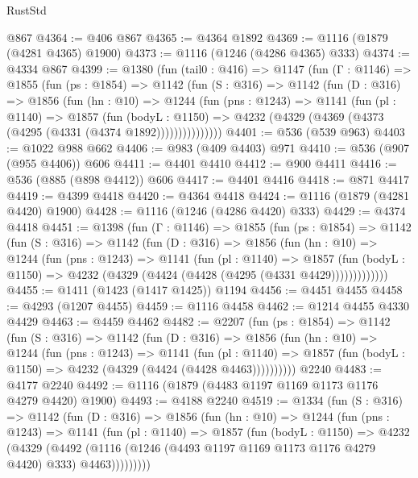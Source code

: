 \begin{lexlean}{RustStd}
\begin{coremodule}
{\begin{coremodule}
{{{{{{{{{{{    @867
@4364 := @406 @867
@4365 := @4364 @1892
@4369 := @1116 (@1879 (@4281 @4365) @1900)
@4373 := @1116 (@1246 (@4286 @4365) @333)
@4374 := @4334 @867
@4399 := @1380
    (fun (tail0 : @416) =>
    @1147
      (fun (Γ : @1146) =>
      @1855
        (fun (ps : @1854) =>
        @1142
          (fun (S : @316) =>
          @1142
            (fun (D : @316) =>
            @1856
              (fun (hn : @10) =>
              @1244
                (fun (pns : @1243) =>
                @1141
                  (fun (pl : @1140) =>
                  @1857
                    (fun (bodyL : @1150) =>
                    @4232 (@4329 (@4369 (@4373 (@4295 (@4331 (@4374 @1892)))))))))))))))
@4401 := @536 (@539 @963)
@4403 := @1022 @988 @662
@4406 := @983 (@409 @4403) @971
@4410 := @536 (@907 (@955 @4406)) @606
@4411 := @4401 @4410
@4412 := @900 @4411
@4416 := @536 (@885 (@898 @4412)) @606
@4417 := @4401 @4416
@4418 := @871 @4417
@4419 := @4399 @4418
@4420 := @4364 @4418
@4424 := @1116 (@1879 (@4281 @4420) @1900)
@4428 := @1116 (@1246 (@4286 @4420) @333)
@4429 := @4374 @4418
@4451 := @1398
    (fun (Γ : @1146) =>
    @1855
      (fun (ps : @1854) =>
      @1142
        (fun (S : @316) =>
        @1142
          (fun (D : @316) =>
          @1856
            (fun (hn : @10) =>
            @1244
              (fun (pns : @1243) =>
              @1141
                (fun (pl : @1140) =>
                @1857
                  (fun (bodyL : @1150) =>
                  @4232 (@4329 (@4424 (@4428 (@4295 (@4331 @4429)))))))))))))
@4455 := @1411 (@1423 (@1417 @1425)) @1194
@4456 := @4451 @4455
@4458 := @4293 (@1207 @4455)
@4459 := @1116 @4458
@4462 := @1214 @4455 @4330 @4429
@4463 := @4459 @4462
@4482 := @2207
    (fun (ps : @1854) =>
    @1142
      (fun (S : @316) =>
      @1142
        (fun (D : @316) =>
        @1856
          (fun (hn : @10) =>
          @1244
            (fun (pns : @1243) =>
            @1141
              (fun (pl : @1140) =>
              @1857 (fun (bodyL : @1150) => @4232 (@4329 (@4424 (@4428 @4463))))))))))
    @2240
@4483 := @4177 @2240
@4492 := @1116 (@1879 (@4483 @1197 @1169 @1173 @1176 @4279 @4420) @1900)
@4493 := @4188 @2240
@4519 := @1334
    (fun (S : @316) =>
    @1142
      (fun (D : @316) =>
      @1856
        (fun (hn : @10) =>
        @1244
          (fun (pns : @1243) =>
          @1141
            (fun (pl : @1140) =>
            @1857
              (fun (bodyL : @1150) =>
              @4232
                (@4329
                  (@4492
                    (@1116 (@1246 (@4493 @1197 @1169 @1173 @1176 @4279 @4420) @333) @4463)))))))))
}}}}}}}}}}}
\end{coremodule}}
\end{coremodule}
\end{lexlean}
